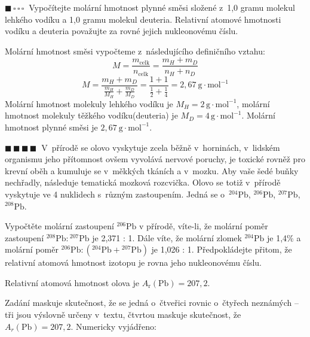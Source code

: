 \documentclass{book}
\newcommand{\jeden}{$\blacksquare \, \square \, \square \, \square \; \; $}
\newcommand{\ctyri}{$\blacksquare \, \blacksquare \, \blacksquare \, \blacksquare \; \; $}
\renewenvironment{quotation}{\par}{\par} %
\begin{document}
\hrulefill %
\begin{quotation}
\jeden Vypočítejte molární hmotnost plynné směsi složené z~1,0 gramu molekul lehkého
vodíku a 1,0 gramu molekul deuteria. Relativní atomové hmotnosti vodíku
a deuteria považujte za rovné jejich nukleonovému číslu.
\end{quotation} \dotfill \par 
Molární hmotnost směsi vypočteme z~následujícího definičního vztahu: 
\[
M=\frac{m_{\mathrm{celk}}}{n_{\mathrm{celk}}}=\frac{m_{H}+m_{D}}{n_{H}+n_{D}}
\]
\[
M=\frac{m_{H}+m_{D}}{\frac{m_{H}}{M_{H}}+\frac{m_{D}}{M_{D}}}=\frac{1+1}{\frac{1}{2}+\frac{1}{4}}=2,67\ \mathrm{g\cdot mol^{-1}}
\]
Molární hmotnost molekuly lehkého vodíku je $M_H = 2\, \mathrm{g\cdot mol^{-1}}$, molární hmotnost molekuly těžkého vodíku(deuteria) je $M_D = 4\, \mathrm{g\cdot mol^{-1}}$. Molární hmotnost plynné směsi je $2,67\ \mathrm{g\cdot mol^{-1}}$.

\newpage %

\hrulefill %
\begin{quotation}
\ctyri V~přírodě se olovo vyskytuje zcela běžně v~horninách, v~lidském organismu jeho přítomnost ovšem vyvolává nervové poruchy, je toxické rovněž pro krevní
oběh a kumuluje se v~měkkých tkáních a v~mozku. Aby vaše šedé buňky nechřadly, následuje tematická
mozková rozcvička. Olovo se totiž v~přírodě vyskytuje ve 4 nuklidech
s~různým zastoupením. Jedná se o~$^{204}\mathrm{Pb}$, $^{206}\mathrm{Pb}$, $^{207}\mathrm{Pb}$,
$^{208}\mathrm{Pb}$. 

Vypočtěte molární zastoupení $^{206}\mathrm{Pb}$
v přírodě, víte-li, že molární poměr zastoupení $^{208}\mathrm{Pb}:{}^{207}\mathrm{Pb}$
je 2,371 : 1. Dále víte, že molární zlomek $^{204}\mathrm{Pb}$ je 1,4\% a
molární poměr $^{206}\mathrm{Pb}:(^{204}\mathrm{Pb}+{}^{207}\mathrm{Pb})$ je 1,026 : 1. Předpokládejte
přitom, že relativní atomová hmotnost izotopu je rovna jeho nukleonovému
číslu.

Relativní atomová hmotnost olova je $A_{\mathrm{r}}(\mathrm{Pb})=207,2$.

\end{quotation} \dotfill \par 
Zadání maskuje skutečnost, že se jedná o~čtveřici rovnic o~čtyřech
neznámých -- tři jsou výslovně určeny v~textu, čtvrtou maskuje skutečnost,
že $A_{r}(\mathrm{Pb})=207,2$. Numericky vyjádřeno: 
\end{document}
